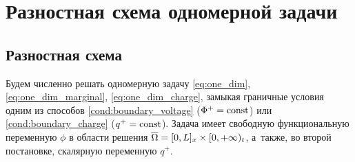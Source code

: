 
\section{Разностная схема одномерной задачи}
\label{sec:difference_scheme}

\subsection{Разностная схема}

Будем численно решать одномерную задачу \eqref{eq:one_dim}, \eqref{eq:one_dim_marginal}, \eqref{eq:one_dim_charge}, замыкая граничные условия одним из способов \eqref{cond:boundary_voltage} ($\Phi^+ = \operatorname{{const}}$) или \eqref{cond:boundary_charge} ($q^+ = \operatorname{{const}}$). Задача имеет свободную функциональную переменную $\phi$ в области решения ${\overline{\Omega}} = [0, L]_x \times [0, +\infty)_t$, а~также, во второй постановке, скалярную переменную $q^+$.


